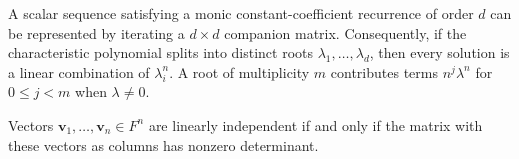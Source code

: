 \begin{theorem}
A scalar sequence satisfying a monic constant-coefficient recurrence of order $d$ can be represented by iterating a $d\times d$ companion matrix. Consequently, if the characteristic polynomial splits into distinct roots $\lambda_1,\dots,\lambda_d$, then every solution is a linear combination of $\lambda_i^n$. A root of multiplicity $m$ contributes terms $n^j\lambda^n$ for $0\le j<m$ when $\lambda\ne0$.
\end{theorem}

\begin{theorem}
Vectors $\mathbf{v}_1,\dots,\mathbf{v}_n\in F^n$ are linearly independent if and only if the matrix with these vectors as columns has nonzero determinant.
\end{theorem}
